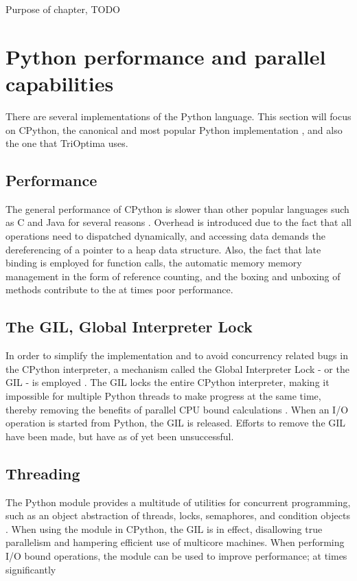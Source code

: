Purpose of chapter, TODO

\section{Python performance and parallel capabilities}
There are several implementations of the Python language. This section will focus on CPython, the canonical and most popular
Python implementation \cite{pythonimplementations_ppw}, and also the one that TriOptima uses.

\subsection{Performance}
The general performance of CPython is slower than other popular languages such as C and Java for several
reasons \cite{barany_2014_python_pipd}. Overhead is introduced due to the fact that all operations need to dispatched dynamically,
and accessing data demands the dereferencing of a pointer to a heap data structure. Also, the fact that late binding is employed
for function calls, the automatic memory memory management in the form of reference counting, and the boxing and unboxing of
methods contribute to the at times poor performance.

\subsection{The GIL, Global Interpreter Lock}
In order to simplify the implementation and to avoid concurrency related bugs in the CPython interpreter,
a mechanism called the Global Interpreter Lock - or the GIL - is employed  \cite{palach_2014_parallel_ppwp}.
The GIL locks the entire CPython interpreter, making it impossible for multiple Python threads to make progress at
the same time, thereby removing the benefits of parallel CPU bound calculations
\cite{glossary_gp2d}. When an I/O operation is started from Python, the GIL is released.
Efforts to remove the GIL have been made, but have as of yet been unsuccessful.

\subsection{Threading}
The Python  module provides a multitude of utilities for concurrent programming, such as an object abstraction of
threads, locks, semaphores, and condition objects \cite{16_1thtip2d}. When using the  module in CPython, the GIL is in
effect, disallowing true parallelism and hampering efficient use of multicore machines. When performing I/O bound operations, the
 module can be used to improve performance; at times significantly \cite[p. 121-124]{slatkin_2015_effective_ep5swtwbp}


